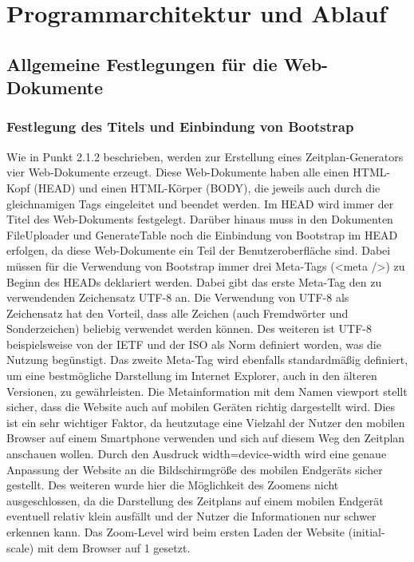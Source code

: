 {\section{Programmarchitektur und Ablauf}

\subsection{Allgemeine Festlegungen für die Web-Dokumente}

\subsubsection{Festlegung des Titels und Einbindung von Bootstrap}
Wie in Punkt 2.1.2 beschrieben, werden zur Erstellung eines Zeitplan-Generators vier Web-Dokumente erzeugt. Diese Web-Dokumente haben alle einen HTML-Kopf (HEAD) und einen HTML-Körper (BODY), die jeweils auch durch die gleichnamigen Tags eingeleitet und beendet werden. 
Im HEAD wird immer der Titel des Web-Dokuments festgelegt. 
Darüber hinaus muss in den Dokumenten FileUploader und GenerateTable noch die Einbindung von Bootstrap im HEAD erfolgen, da diese Web-Dokumente ein Teil der Benutzeroberfläche sind. 
Dabei müssen für die Verwendung von Bootstrap immer drei Meta-Tags (<meta />) zu Beginn des HEADs deklariert werden. 
Dabei gibt das erste Meta-Tag den zu verwendenden Zeichensatz \ac{UTF-8} an. Die Verwendung von UTF-8 als Zeichensatz hat den Vorteil, dass alle Zeichen (auch Fremdwörter und Sonderzeichen) beliebig verwendet werden können. Des weiteren ist UTF-8 beispielsweise von der \ac{IETF} und der \ac{ISO} als Norm definiert worden, was die Nutzung begünstigt. 
Das zweite Meta-Tag wird ebenfalls standardmäßig definiert, um eine bestmögliche Darstellung im Internet Explorer, auch in den älteren Versionen, zu gewährleisten. 
Die Metainformation mit dem Namen viewport stellt sicher, dass die Website auch auf mobilen Geräten richtig dargestellt wird. Dies ist ein sehr wichtiger Faktor, da heutzutage eine Vielzahl der Nutzer den mobilen Browser auf einem Smartphone verwenden und sich auf diesem Weg den Zeitplan anschauen wollen. Durch den Ausdruck width=device-width wird eine genaue Anpassung der Website an die Bildschirmgröße des mobilen Endgeräts sicher gestellt. Des weiteren wurde hier die Möglichkeit des Zoomens nicht ausgeschlossen, da die Darstellung des Zeitplans auf einem mobilen Endgerät eventuell relativ klein ausfällt und der Nutzer die Informationen nur schwer erkennen kann. Das Zoom-Level wird beim ersten Laden der Website (initial-scale) mit dem Browser auf 1 gesetzt. 
}
